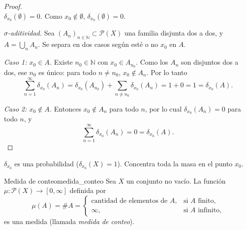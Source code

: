 \documentclass[11pt, a4paper]{article}
\begin{document}
\begin{proof}\leavevmode\\
\textit{$\delta_{x_0}(\emptyset) = 0$.} Como $x_0 \notin \emptyset$, $\delta_{x_0}(\emptyset) = 0$.

\textit{$\sigma$-aditividad.} Sea $(A_n)_{n \in \mathbb{N}} \subset \mathcal{P}(X)$ una familia
disjunta dos a dos, y $A = \bigcup_{n} A_n$. Se separa en dos casos según esté o no $x_0$ en
$A$.

\textit{Caso 1: $x_0 \in A$.} Existe $n_0 \in \mathbb{N}$ con $x_0 \in A_{n_0}$. Como los
$A_n$ son disjuntos dos a dos, ese $n_0$ es único: para todo $n \ne n_0$, $x_0 \notin A_n$.
Por lo tanto
$$ \sum_{n=1}^{\infty} \delta_{x_0}(A_n) = \delta_{x_0}(A_{n_0}) + \sum_{n \ne n_0}
\delta_{x_0}(A_n) = 1 + 0 = 1 = \delta_{x_0}(A). $$

\textit{Caso 2: $x_0 \notin A$.} Entonces $x_0 \notin A_n$ para todo $n$, por lo cual
$\delta_{x_0}(A_n) = 0$ para todo $n$, y
$$ \sum_{n=1}^{\infty} \delta_{x_0}(A_n) = 0 = \delta_{x_0}(A). $$
\end{proof}

\obs $\delta_{x_0}$ es una probabilidad ($\delta_{x_0}(X) = 1$). Concentra toda la masa en el
punto $x_0$.

\begin{proposicion}{Medida de conteo}{medida_conteo}
Sea $X$ un conjunto no vacío. La función $\mu: \mathcal{P}(X) \to [0, \infty]$ definida por
$$ \mu(A) = \#A = \begin{cases} \text{cantidad de elementos de } A, & \text{si } A \text{ finito,}
\\ \infty, & \text{si } A \text{ infinito,} \end{cases} $$
es una medida (llamada \emph{medida de conteo}).
\end{proposicion}
\end{document}
